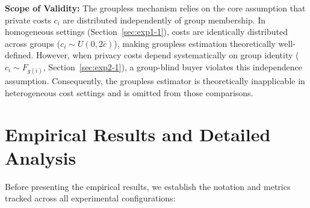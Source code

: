 \documentclass[11pt,a4paper]{article}
\begin{document}
\textbf{Scope of Validity:} The groupless mechanism relies on the core assumption that private costs $c_i$ are distributed independently of group membership. In homogeneous settings (Section~\ref{sec:exp1-1}), costs are identically distributed across groups ($c_i \sim U(0, 2\bar{c})$), making groupless estimation theoretically well-defined. However, when privacy costs depend systematically on group identity ($c_i \sim F_{g(i)}$, Section~\ref{sec:exp2-1}), a group-blind buyer violates this independence assumption. Consequently, the groupless estimator is theoretically inapplicable in heterogeneous cost settings and is omitted from those comparisons.

\section{Empirical Results and Detailed Analysis}
Before presenting the empirical results, we establish the notation and metrics tracked across all experimental configurations:
\end{document}
